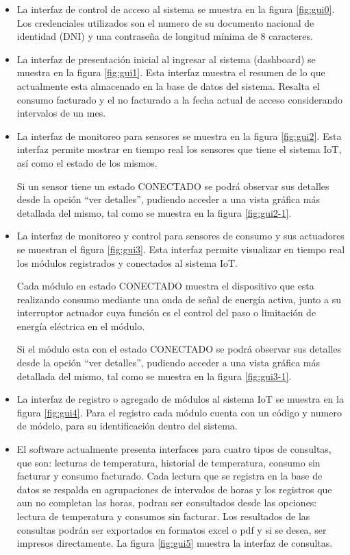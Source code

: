 \begin{itemize}
\item La interfaz de control de acceso al sistema se muestra en la figura \ref{fig:gui0}. Los credenciales utilizados son el numero de su documento nacional de identidad (DNI) y una contraseña de longitud mínima de 8 caracteres.

\item La interfaz de presentación inicial al ingresar al sistema (dashboard) se muestra en la figura \ref{fig:gui1}. Esta interfaz muestra el resumen de lo que actualmente esta almacenado en la base de datos del sistema. Resalta el consumo facturado y el no facturado a la fecha actual de acceso considerando intervalos de un mes.

\item La interfaz de monitoreo para sensores se muestra en la figura \ref{fig:gui2}. Esta interfaz permite mostrar en tiempo real los sensores que tiene el sistema IoT, así como el estado de los mismos. 

Si un sensor tiene un estado CONECTADO se podrá observar sus detalles desde la opción ``ver detalles'', pudiendo acceder a una vista gráfica más detallada del mismo, tal como se muestra en la figura \ref{fig:gui2-1}.

\item La interfaz de monitoreo y control para sensores de consumo y sus actuadores se muestran el figura \ref{fig:gui3}. Esta interfaz permite visualizar en tiempo real los módulos registrados y conectados al sistema IoT.

Cada módulo en estado CONECTADO muestra el dispositivo que esta realizando consumo mediante una onda de señal de energía activa, junto a su interruptor actuador cuya función es el control del paso o limitación de energía eléctrica en el módulo.

Si el módulo esta con el estado CONECTADO se podrá observar sus detalles desde la opción ``ver detalles'', pudiendo acceder a una vista gráfica más detallada del mismo, tal como se muestra en la figura \ref{fig:gui3-1}.

\item La interfaz de registro o agregado de módulos al sistema IoT se muestra en la figura \ref{fig:gui4}. Para el registro cada módulo cuenta con un código y numero de módelo, para su identificación dentro del sistema.

\item El software actualmente presenta interfaces para cuatro tipos de consultas, que son: lecturas de temperatura, historial de temperatura, consumo sin facturar y consumo facturado. Cada lectura que se registra en la base de datos se respalda en agrupaciones de intervalos de horas y los registros que aun no completan las horas, podran ser consultados desde las opciones: lectura de temperatura y consumos sin facturar. Los resultados de las consultas podrán ser exportados en formatos excel o pdf y si se desea, ser impresos directamente. La figura \ref{fig:gui5} muestra la interfaz de consultas.

\end{itemize}






